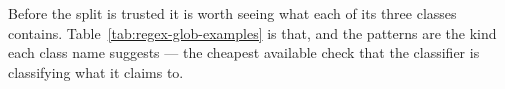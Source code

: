 \noindent
Before the split is trusted it is worth seeing what each of its three classes
contains. Table~\ref{tab:regex-glob-examples} is that, and the patterns are the kind
each class name suggests --- the cheapest available check that the classifier is
classifying what it claims to.

\begin{table}[htbp]\centering\footnotesize

\caption{The three most frequent regular expressions of each outcome.}
\label{tab:regex-glob-examples}
\end{table}
